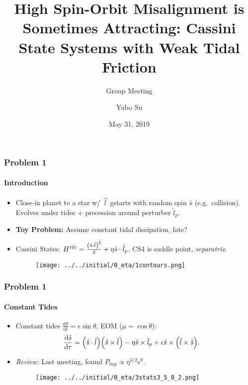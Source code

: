 \documentclass[dvipsnames, 11pt]{beamer}
\newcommand*{\rd}[2]{\frac{\mathrm{d}#1}{\mathrm{d}#2}}
\DeclarePairedDelimiter\p{\lparen}{\rparen}
\begin{document}
\title[Cassini S-O Misalignment]{High Spin-Orbit Misalignment is Sometimes
Attracting: Cassini State Systems with Weak Tidal Friction}
\subtitle{Group Meeting}
\author{Yubo Su}
\date{May 31, 2019}

\maketitle

\begin{frame}
    \frametitle{Problem 1}
    \framesubtitle{Introduction}

    \begin{itemize}
        \item Close-in planet to a star w/ $\vec{l}$ gstarts with random spin
            $\hat{s}$ (e.g.\ collision). Evolves under tides + precession around
            perturber $\hat{l}_p$.

        \item \textbf{Toy Problem:} Assume constant tidal dissipation, fate?

        \item Cassini States: $H^{(0)} = \frac{\p*{\hat{s} \cdot \hat{l}}^2}{2}
            + \eta \hat{s} \cdot \hat{l}_p$. CS4 is saddle point,
            \emph{separatrix}.

        \begin{figure}[t]
            \centering
            \texttt{[image: ../../initial/0\_eta/1contours.png]}
        \end{figure}
    \end{itemize}
\end{frame}

\begin{frame}
    \frametitle{Problem 1}
    \framesubtitle{Constant Tides}

    \begin{itemize}
        \item Constant tides $\rd{\theta}{t} = \epsilon \sin\theta$,
            EOM ($\mu = \cos \theta$):
            \begin{align*}
                \rd{\hat{s}}{\tau}
                    &= \p*{\hat{s} \cdot \hat{l}}\p*{\hat{s} \times \hat{l}}
                        - \eta\hat{s} \times \hat{l}_p +
                        \epsilon \hat{s} \times \p*{\hat{l} \times \hat{s}}.
            \end{align*}

        \item \emph{Review:} Last meeting, found $P_{hop} \propto
            \eta^{3/2}\epsilon^0$.

        \begin{figure}
            \centering
            \texttt{[image: ../../initial/0\_eta/3stats3\_5\_0\_2.png]}
        \end{figure}
    \end{itemize}
\end{frame}
\end{document}
